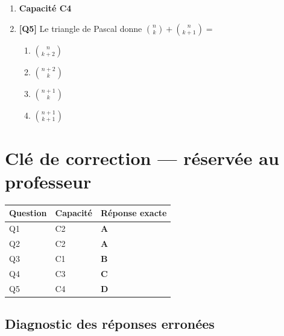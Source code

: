 \begin{enumerate}
\item[] \textbf{Capacité C4}

\item \textbf{[Q5]} Le triangle de Pascal donne $\binom{n}{k} + \binom{n}{k+1} =$
  \begin{enumerate}[label=\Alph*.]
    \item $\binom{n}{k+2}$
    \item $\binom{n+2}{k}$
    \item $\binom{n+1}{k}$
    \item $\binom{n+1}{k+1}$
  \end{enumerate}

\end{enumerate}

\ifnxVersionProfesseur
\clearpage
\section*{Clé de correction — réservée au professeur}

\begin{center}
\begin{tabular}{lll}
\hline
Question & Capacité & Réponse exacte \\
\hline
Q1 & C2 & \textbf{A} \\
Q2 & C2 & \textbf{A} \\
Q3 & C1 & \textbf{B} \\
Q4 & C3 & \textbf{C} \\
Q5 & C4 & \textbf{D} \\
\hline
\end{tabular}
\end{center}

\subsection*{Diagnostic des réponses erronées}

